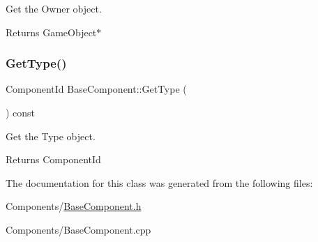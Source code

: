 Get the Owner object. 

\begin{DoxyReturn}{Returns}
Game\+Object$\ast$ 
\end{DoxyReturn}
\mbox{\label{classBaseComponent_a50e4481cdb27430cf4a5a10f1a06af35}} 
\subsubsection{\texorpdfstring{Get\+Type()}{GetType()}}
{\footnotesize\ttfamily Component\+Id Base\+Component\+::\+Get\+Type (\begin{DoxyParamCaption}{ }\end{DoxyParamCaption}) const\hspace{0.3cm}{\ttfamily [inline]}}



Get the Type object. 

\begin{DoxyReturn}{Returns}
Component\+Id 
\end{DoxyReturn}


The documentation for this class was generated from the following files\+:\begin{DoxyCompactItemize}
\item 
Components/\hyperlink{BaseComponent_8h}{Base\+Component.\+h}\item 
Components/Base\+Component.\+cpp\end{DoxyCompactItemize}
